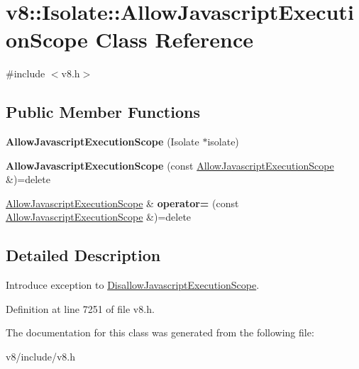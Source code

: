\hypertarget{classv8_1_1Isolate_1_1AllowJavascriptExecutionScope}{}\section{v8\+:\+:Isolate\+:\+:Allow\+Javascript\+Execution\+Scope Class Reference}
\label{classv8_1_1Isolate_1_1AllowJavascriptExecutionScope}


{\ttfamily \#include $<$v8.\+h$>$}

\subsection*{Public Member Functions}
\begin{DoxyCompactItemize}
\item 
\mbox{\label{classv8_1_1Isolate_1_1AllowJavascriptExecutionScope_ac73a647c33756c6b7c3896170e069e8c}} 
{\bfseries Allow\+Javascript\+Execution\+Scope} (Isolate $\ast$isolate)
\item 
\mbox{\label{classv8_1_1Isolate_1_1AllowJavascriptExecutionScope_a20bf639420617b08404e2bed1b203dbc}} 
{\bfseries Allow\+Javascript\+Execution\+Scope} (const \mbox{\hyperlink{classv8_1_1Isolate_1_1AllowJavascriptExecutionScope}{Allow\+Javascript\+Execution\+Scope}} \&)=delete
\item 
\mbox{\label{classv8_1_1Isolate_1_1AllowJavascriptExecutionScope_a436e3fc96e3796ccfd265a153d71224a}} 
\mbox{\hyperlink{classv8_1_1Isolate_1_1AllowJavascriptExecutionScope}{Allow\+Javascript\+Execution\+Scope}} \& {\bfseries operator=} (const \mbox{\hyperlink{classv8_1_1Isolate_1_1AllowJavascriptExecutionScope}{Allow\+Javascript\+Execution\+Scope}} \&)=delete
\end{DoxyCompactItemize}


\subsection{Detailed Description}
Introduce exception to \mbox{\hyperlink{classv8_1_1Isolate_1_1DisallowJavascriptExecutionScope}{Disallow\+Javascript\+Execution\+Scope}}. 

Definition at line 7251 of file v8.\+h.



The documentation for this class was generated from the following file\+:\begin{DoxyCompactItemize}
\item 
v8/include/v8.\+h\end{DoxyCompactItemize}
